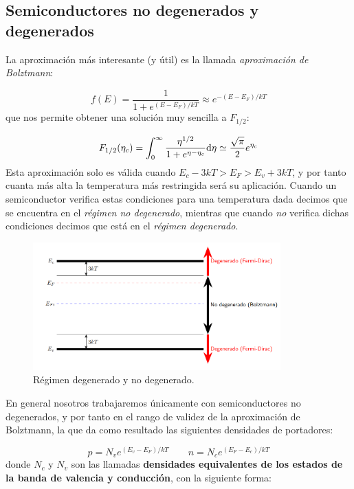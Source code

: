 \subsection{Semiconductores no degenerados y degenerados}

La aproximación más interesante (y útil) es la llamada \textit{aproximación de Bolztmann}:

\begin{equation}
	f(E) = \frac{1}{1+e^{(E-E_F)/kT}} \approx e^{-(E-E_F)/kT}
\end{equation}
que nos permite obtener una solución muy sencilla a $F_{1/2}$:

\begin{equation}
	F_{1/2} (\eta_c) = \int_{0}^{\infty} \frac{\eta^{1/2}}{1+ e^{\eta-\eta_c}} \mathrm{d} \eta \simeq \frac{\sqrt{\pi}}{2} e^{\eta_c}
\end{equation}
Esta aproximación solo es válida cuando $E_c-3kT>E_F>E_v+3kT$, y por tanto cuanta más alta la temperatura más restringida será su aplicación. Cuando un semiconductor verifica estas condiciones para una temperatura dada decimos que se encuentra en el \textit{régimen no degenerado}, mientras que cuando \textit{no} verifica dichas condiciones decimos que está en el \textit{régimen degenerado}.

\begin{figure}[h!] \centering
	\includegraphics[width=0.85\textwidth]{Cuerpo/Ch_01/01_03.png}
	\caption{Régimen degenerado y no degenerado.}
\end{figure}


En general nosotros trabajaremos únicamente con semiconductores no degenerados, y por tanto en el rango de validez de la aproximación de Bolztmann, la que da como resultado las siguientes densidades de portadores:

\begin{equation}
	p=N_v e^{(E_v-E_F)/kT}  \qquad n = N_c e^{(E_F-E_c)/kT}
\end{equation}
donde $N_c$ y $N_v$ son las llamadas \textbf{densidades equivalentes de los estados de la banda de valencia y conducción}, con la siguiente forma:

